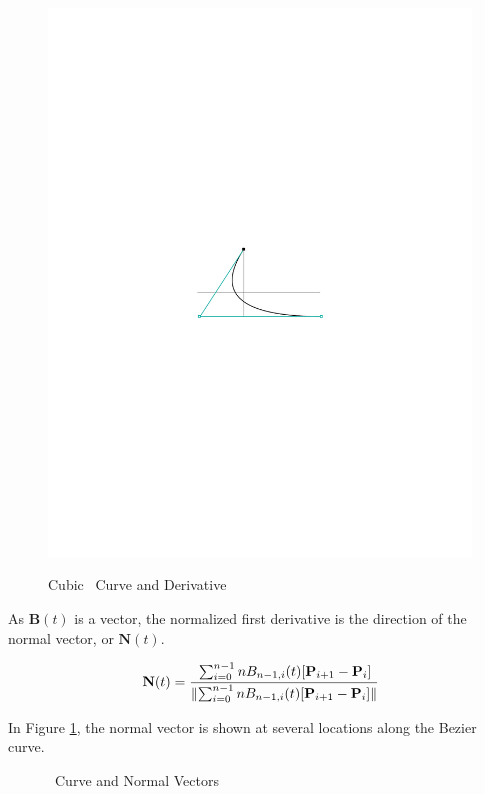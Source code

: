 \documentclass[oneside,usepdftitle=true]{article}
\providecommand{\norm}[1]{\lVert#1\rVert}
\begin{document}
\begin{figure}[htp]
\begin{center}
{		\includegraphics{figure_bezier_spline_deriv}
	}
	
	\caption{Cubic \Bezier\ Curve and Derivative}
\end{center}
\end{figure}

As $\mathbf{B}(t)$ is a vector, the normalized first derivative is the direction of the normal vector, or $\mathbf{N}(t).$

\begin{equation}\label{eqn:bezier_normal}
	\mathbf{N}(t) = \cfrac{\sum_{i=0}^{n-1} n B_{n-1,i}(t) [ \mathbf{P}_{i+1} - \mathbf{P}_i ]}{\norm{\sum_{i=0}^{n-1} n B_{n-1,i}(t) [ \mathbf{P}_{i+1} - \mathbf{P}_i ]}}
\end{equation}

In Figure \ref{fig:bezier_spline_normal}, the normal vector is shown at several locations along the Bezier curve.

\begin{figure}[htp]
\begin{center}
	\label{fig:bezier_spline_normal}
	\vspace{130pt}
	\caption{\Bezier\ Curve and Normal Vectors}
\end{center}
\end{figure}
\end{document}
